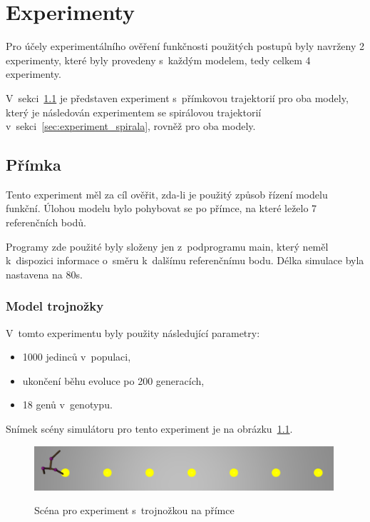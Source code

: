 \chapter{Experimenty}
\label{chap:experimenty}
Pro účely experimentálního ověření funkčnosti použitých postupů byly navrženy 2 experimenty, které byly provedeny s~každým modelem, tedy celkem 4 experimenty.

V~sekci~\ref{sec:experiment_primka} je představen experiment s~přímkovou trajektorií pro oba modely, který je následován experimentem se spirálovou trajektorií v~sekci~\ref{sec:experiment_spirala}, rovněž pro oba modely.


\section{Přímka}
\label{sec:experiment_primka}

Tento experiment měl za cíl ověřit, zda-li je použitý způsob řízení modelu funkční.
Úlohou modelu bylo pohybovat se po přímce, na které leželo 7 referenčních bodů.

Programy zde použité byly složeny jen z~podprogramu main, který neměl k~dispozici informace o~směru k~dalšímu referenčnímu bodu.
Délka simulace byla nastavena na 80s.

\subsection{Model trojnožky}
V~tomto experimentu byly použity následující parametry:
\begin{itemize}
    \item 1000 jedinců v~populaci,
    \item ukončení běhu evoluce po 200 generacích,
    \item 18 genů v~genotypu.
\end{itemize}

Snímek scény simulátoru pro tento experiment je na obrázku~\ref{fig:trojnozka_primka_zhora}.
\begin{figure}[h]
    \centering
    {\includegraphics[width=30em]{obrazky/trojnozka_primka_zhora.png}}
    \caption{
    Scéna pro experiment s~trojnožkou na přímce
    }
    \label{fig:trojnozka_primka_zhora}
\end{figure}



